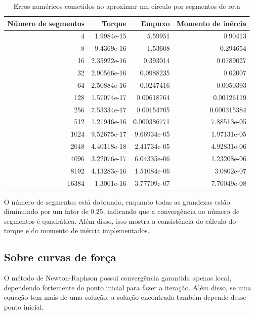 \documentclass[
	12pt,				%
	oneside,			%
	a4paper,			%
	]{article}
\begin{document}
    \begin{table}[H]
        \centering
        \begin{tabular}{rrrr}
            \hline
            Número de segmentos &      Torque &      Empuxo &   Momento de inércia \\
            \hline
                                4 &  1.9984e-15 &     5.59951 &              0.90413 \\
                                8 &  9.4369e-16 &     1.53608 &             0.294654 \\
                                16 & 2.35922e-16 &    0.393014 &            0.0789027 \\
                                32 & 2.90566e-16 &   0.0988235 &              0.02007 \\
                                64 & 2.50884e-16 &   0.0247416 &            0.0050393 \\
                            128 & 1.57074e-17 &  0.00618764 &           0.00126119 \\
                            256 & 7.53334e-17 &  0.00154705 &          0.000315384 \\
                            512 & 1.21946e-16 & 0.000386771 &          7.88513e-05 \\
                            1024 & 9.52675e-17 & 9.66934e-05 &          1.97131e-05 \\
                            2048 & 4.40118e-18 & 2.41734e-05 &          4.92831e-06 \\
                            4096 & 3.22076e-17 & 6.04335e-06 &          1.23208e-06 \\
                            8192 & 4.13283e-16 & 1.51084e-06 &           3.0802e-07 \\
                            16384 &  1.3001e-16 & 3.77709e-07 &          7.70049e-08 \\
            \hline
        \end{tabular}
        \caption{Erros numéricos cometidos ao aproximar um círculo por segmentos de reta}
        \label{table:conv_circle2}
    \end{table}

    O número de segmentos está dobrando, enquanto todas as grandezas estão diminuindo por um fator de $0.25$, indicando que a convergência no número de segmentos é quadrática. Além disso, isso mostra a consistência do cálculo do torque e do momento de inércia implementados.

    \subsection{Sobre curvas de força}
    O método de Newton-Raphson possui convergência garantida apenas local, dependendo fortemente do ponto inicial para fazer a iteração. Além disso, se uma equação tem mais de uma solução, a solução encontrada também depende desse ponto inicial. 
    
\end{document}
